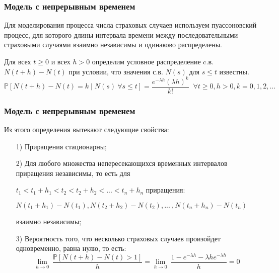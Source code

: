 \documentclass[10pt]{beamer}
\begin{document}
\begin{frame}
\frametitle{Модель с непрерывным временем}
\noindent
Для моделирования процесса числа страховых случаев используем пуассоновский процесс,
для которого длины интервала времени между последовательными страховыми случаями взаимно независимы и одинаково распределены.
\par\medskip \noindent
Для всех $t\geq 0$ и всех $h>0$ определим условное распределение c.в. $N(t + h) - N(t)$ при условии, что значения с.в. $N(s)$ для $s \leq t$ известны.
\begin{equation*}
\mathbb{P}[N(t+h)-N(t)=k \mid N(s)\ \forall s \leq t] = \frac{e^{- \lambda h}(\lambda h)^{k}}{k!}
\;\; \forall t \geq 0, h > 0, k = 0, 1, 2, \dots
\end{equation*}
\end{frame}


\begin{frame}
\frametitle{Модель с непрерывным временем}
\noindent
Из этого определения вытекают следующие свойства:
\begin{enumerate}
    \item[1)] Приращения стационарны;
    \item[2)] Для любого множества непересекающихся временных интервалов приращения независимы,
    то есть для
    \par\smallskip
    $t_{1}<t_{1}+h_{1}<t_{2}<t_{2}+h_{2}<...<t_{n}+h_{n}$
    приращения:
    \par\smallskip
    $N(t_{1}+h_{1})-N(t_{1}), N(t_{2}+h_{2})-N(t_{2}),...\:,N(t_{n}+h_{n})-N(t_{n})$
    \par\smallskip
    взаимно независимы;
    \item[3)] Вероятность того, что несколько страховых случаев произойдет одновременно, равна нулю,
    то есть:
    \begin{equation*}
        \lim_{h \rightarrow 0} \: \frac{\mathbb{P}[N(t+h)-N(t)>1]}{h} =
        \lim_{h \rightarrow 0} \: \frac{1-e^{- \lambda h}- \lambda he^{- \lambda h}}{h} = 0
    \end{equation*}
\end{enumerate}
\end{frame}
\end{document}
